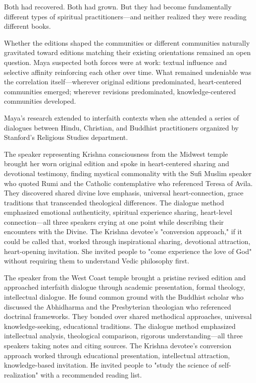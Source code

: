 \documentclass[12pt,twoside]{book}
\begin{document}
Both had recovered. Both had grown. But they had become fundamentally different types of spiritual practitioners—and neither realized they were reading different books.

Whether the editions shaped the communities or different communities naturally gravitated toward editions matching their existing orientations remained an open question. Maya suspected both forces were at work: textual influence and selective affinity reinforcing each other over time. What remained undeniable was the correlation itself—wherever original editions predominated, heart-centered communities emerged; wherever revisions predominated, knowledge-centered communities developed.

Maya's research extended to interfaith contexts when she attended a series of dialogues between Hindu, Christian, and Buddhist practitioners organized by Stanford's Religious Studies department.

The speaker representing Krishna consciousness from the Midwest temple brought her worn original edition and spoke in heart-centered sharing and devotional testimony, finding mystical commonality with the Sufi Muslim speaker who quoted Rumi and the Catholic contemplative who referenced Teresa of Avila. They discovered shared divine love emphasis, universal heart-connection, grace traditions that transcended theological differences. The dialogue method emphasized emotional authenticity, spiritual experience sharing, heart-level connection—all three speakers crying at one point while describing their encounters with the Divine. The Krishna devotee's "conversion approach," if it could be called that, worked through inspirational sharing, devotional attraction, heart-opening invitation. She invited people to "come experience the love of God" without requiring them to understand Vedic philosophy first.

The speaker from the West Coast temple brought a pristine revised edition and approached interfaith dialogue through academic presentation, formal theology, intellectual dialogue. He found common ground with the Buddhist scholar who discussed the Abhidharma and the Presbyterian theologian who referenced doctrinal frameworks. They bonded over shared methodical approaches, universal knowledge-seeking, educational traditions. The dialogue method emphasized intellectual analysis, theological comparison, rigorous understanding—all three speakers taking notes and citing sources. The Krishna devotee's conversion approach worked through educational presentation, intellectual attraction, knowledge-based invitation. He invited people to "study the science of self-realization" with a recommended reading list.
\end{document}
